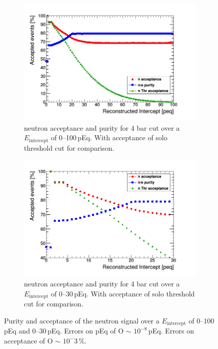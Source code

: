 \documentclass[12pt,a4paper]{article}
\begin{document}
\begin{figure}[H]
\centering
\begin{subfigure}{.5\textwidth}
  \centering
  \includegraphics[width=\linewidth]{Trigger_efficency_and_purityne4.png}
  \captionsetup{width=.9\linewidth}
  \caption{neutron acceptance and purity for 4 bar cut over a $E_\textrm{intercept}$ of 0--100\,pEq. With acceptance of solo threshold cut for comparison.}
  \label{purity_eff_full}
\end{subfigure}%
\begin{subfigure}{.5\textwidth}
  \centering
  \includegraphics[width=\linewidth]{Best4barcut_ne.png}
  \captionsetup{width=.9\linewidth}
  \caption{neutron acceptance and purity for 4 bar cut over a $E_\textrm{intercept}$ of 0--30\,pEq. With acceptance of solo threshold cut for comparison.}
  \label{purity_eff_zoom}
\end{subfigure}
\caption{Purity and acceptance of the neutron signal over a $E_\textrm{intercept}$ of 0--100\,pEq and 0--30\,pEq. Errors on pEq of O $\sim$ $10^{-8}$\,pEq. Errors on acceptance of O $\sim$ $10^-3$\,\%.}
\label{purity_eff_both_cuts}
\end{figure}
\end{document}
